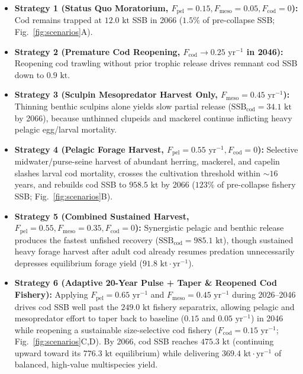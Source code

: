 \documentclass[11pt,letterpaper]{article}
\begin{document}
\begin{itemize}
  \item \textbf{Strategy 1 (Status Quo Moratorium, $F_{\mathrm{pel}}=0.15, F_{\mathrm{meso}}=0.05, F_{\mathrm{cod}}=0$):} Cod remains trapped at $12.0\text{ kt}$ SSB in 2066 ($1.5\%$ of pre-collapse SSB; Fig.~\ref{fig:scenarios}A).
  \item \textbf{Strategy 2 (Premature Cod Reopening, $F_{\mathrm{cod}} \to 0.25\text{ yr}^{-1}$ in 2046):} Reopening cod trawling without prior trophic release drives remnant cod SSB down to $0.9\text{ kt}$.
  \item \textbf{Strategy 3 (Sculpin Mesopredator Harvest Only, $F_{\mathrm{meso}}=0.45\text{ yr}^{-1}$):} Thinning benthic sculpins alone yields slow partial release ($\mathrm{SSB}_{\mathrm{cod}} = 34.1\text{ kt}$ by 2066), because unthinned clupeids and mackerel continue inflicting heavy pelagic egg/larval mortality.
  \item \textbf{Strategy 4 (Pelagic Forage Harvest, $F_{\mathrm{pel}}=0.55\text{ yr}^{-1}, F_{\mathrm{cod}}=0$):} Selective midwater/purse-seine harvest of abundant herring, mackerel, and capelin slashes larval cod mortality, crosses the cultivation threshold within $\sim 16$ years, and rebuilds cod SSB to $958.5\text{ kt}$ by 2066 ($123\%$ of pre-collapse fishery SSB; Fig.~\ref{fig:scenarios}B).
  \item \textbf{Strategy 5 (Combined Sustained Harvest, $F_{\mathrm{pel}}=0.55, F_{\mathrm{meso}}=0.35, F_{\mathrm{cod}}=0$):} Synergistic pelagic and benthic release produces the fastest unfished recovery ($\mathrm{SSB}_{\mathrm{cod}} = 985.1\text{ kt}$), though sustained heavy forage harvest after adult cod already resumes predation unnecessarily depresses equilibrium forage yield ($91.8\text{ kt}\cdot\text{yr}^{-1}$).
  \item \textbf{Strategy 6 (Adaptive 20-Year Pulse + Taper \& Reopened Cod Fishery):} Applying $F_{\mathrm{pel}} = 0.65\text{ yr}^{-1}$ and $F_{\mathrm{meso}} = 0.45\text{ yr}^{-1}$ during 2026--2046 drives cod SSB well past the $249.0\text{ kt}$ fishery separatrix, allowing pelagic and mesopredator effort to taper back to baseline ($0.15$ and $0.05\text{ yr}^{-1}$) in 2046 while reopening a sustainable size-selective cod fishery ($F_{\mathrm{cod}} = 0.15\text{ yr}^{-1}$; Fig.~\ref{fig:scenarios}C,D). By 2066, cod SSB reaches $475.3\text{ kt}$ (continuing upward toward its $776.3\text{ kt}$ equilibrium) while delivering $369.4\text{ kt}\cdot\text{yr}^{-1}$ of balanced, high-value multispecies yield.
\end{itemize}
\end{document}
